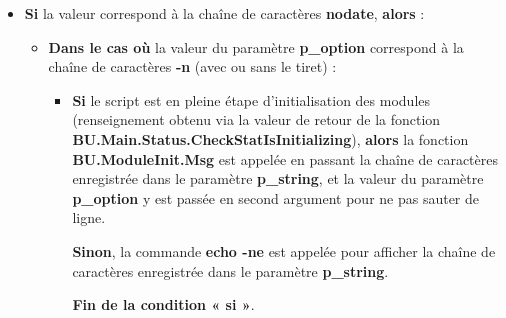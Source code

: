 \documentclass[a4paper,10pt]{article}
\begin{document}
    \begin{itemize}
        \item
        {
            \begin{justify}
                \textbf{\color{cond}Si} la valeur correspond à la chaîne de caractères \textbf{nodate}, \textbf{\color{cond}alors} :
            \end{justify}

            \setlength{\parskip}{1em}

            \begin{itemize}
                \item
                {
                    \begin{justify}
                        \textbf{\color{case}Dans le cas où} la valeur du paramètre \textbf{\color{vars}p\_option} correspond à la chaîne de caractères \textbf{-n} (avec ou sans le tiret) :
                    \end{justify}

                    \setlength{\parskip}{1em}

                    \begin{itemize}
                        \item
                        {
                            \begin{justify}
                                \textbf{\color{cond}Si} le script est en pleine étape d'initialisation des modules (renseignement obtenu via la valeur de retour de la fonction \textbf{\color{func}BU.Main.Status.CheckStatIsInitializing}), \textbf{\color{cond}alors} la fonction \textbf{\color{func}BU.ModuleInit.Msg} est appelée en passant la chaîne de caractères enregistrée dans le paramètre \textbf{\color{vars}p\_string}, et la valeur du paramètre \textbf{\color{vars}p\_option} y est passée en second argument pour ne pas sauter de ligne.
                            \end{justify}

                            \setlength{\parskip}{1em}

                            \begin{justify}
                                \textbf{\color{cond}Sinon}, la commande \textbf{\color{cmds}echo -ne} est appelée pour afficher la chaîne de caractères enregistrée dans le paramètre \textbf{\color{vars}p\_string}.
                            \end{justify}

                            \begin{justify}
                                \textbf{\color{cond}Fin de la condition « si »}.
                        \end{justify}
                        }
                    \end{itemize}

}
\end{itemize}}
\end{itemize}
\end{document}
